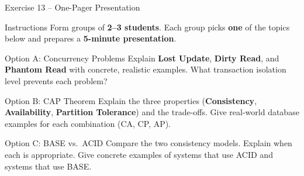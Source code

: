 \documentclass[10pt]{beamer}
\begin{document}
\begin{frame}{Exercise 13 -- One-Pager Presentation}
  \begin{block}{Instructions}
    Form groups of \textbf{2--3 students}. Each group picks \textbf{one} of the topics below and prepares a \textbf{5-minute presentation}.
  \end{block}

  \begin{block}{Option A: Concurrency Problems}
    Explain \textbf{Lost Update}, \textbf{Dirty Read}, and \textbf{Phantom Read} with concrete, realistic examples. What transaction isolation level prevents each problem?
  \end{block}

  \begin{block}{Option B: CAP Theorem}
    Explain the three properties (\textbf{Consistency}, \textbf{Availability}, \textbf{Partition Tolerance}) and the trade-offs. Give real-world database examples for each combination (CA, CP, AP).
  \end{block}

  \begin{block}{Option C: BASE vs.\ ACID}
    Compare the two consistency models. Explain when each is appropriate. Give concrete examples of systems that use ACID and systems that use BASE.
  \end{block}
\end{frame}
\end{document}

